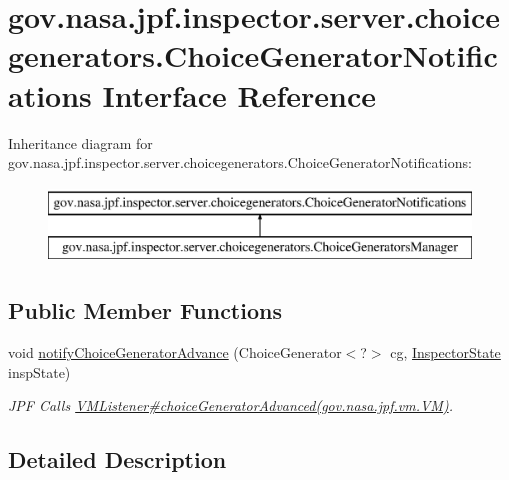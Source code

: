 \hypertarget{interfacegov_1_1nasa_1_1jpf_1_1inspector_1_1server_1_1choicegenerators_1_1_choice_generator_notifications}{}\section{gov.\+nasa.\+jpf.\+inspector.\+server.\+choicegenerators.\+Choice\+Generator\+Notifications Interface Reference}
\label{interfacegov_1_1nasa_1_1jpf_1_1inspector_1_1server_1_1choicegenerators_1_1_choice_generator_notifications}
Inheritance diagram for gov.\+nasa.\+jpf.\+inspector.\+server.\+choicegenerators.\+Choice\+Generator\+Notifications\+:\begin{figure}[H]
\begin{center}
\leavevmode
\includegraphics[height=2.000000cm]{interfacegov_1_1nasa_1_1jpf_1_1inspector_1_1server_1_1choicegenerators_1_1_choice_generator_notifications}
\end{center}
\end{figure}
\subsection*{Public Member Functions}
\begin{DoxyCompactItemize}
\item 
void \hyperlink{interfacegov_1_1nasa_1_1jpf_1_1inspector_1_1server_1_1choicegenerators_1_1_choice_generator_notifications_a1893b82d82c8c5175fe519fe860f6f42}{notify\+Choice\+Generator\+Advance} (Choice\+Generator$<$?$>$ cg, \hyperlink{interfacegov_1_1nasa_1_1jpf_1_1inspector_1_1server_1_1expression_1_1_inspector_state}{Inspector\+State} insp\+State)
\begin{DoxyCompactList}\small\item\em J\+PF Calls \hyperlink{}{V\+M\+Listener\#choice\+Generator\+Advanced(gov.\+nasa.\+jpf.\+vm.\+V\+M)}. \end{DoxyCompactList}\end{DoxyCompactItemize}


\subsection{Detailed Description}


